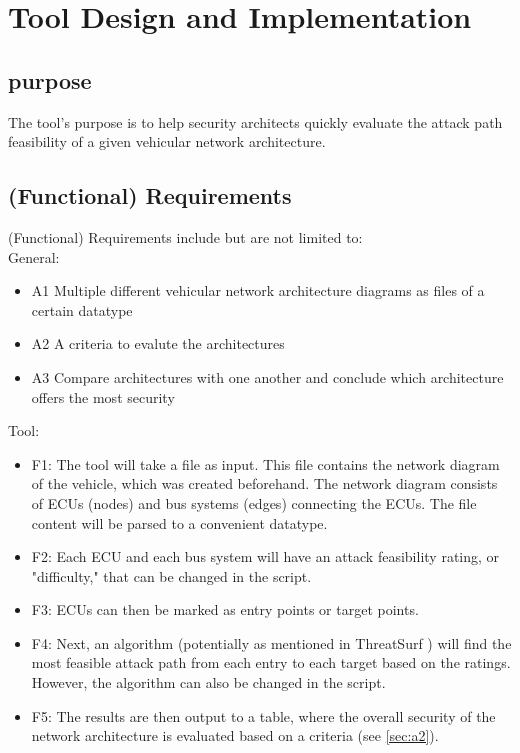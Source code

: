 \chapter{Tool Design and Implementation}
\label{chp:tool}

\section{purpose}\label{sec:purpose}

The tool's purpose is to help security architects quickly evaluate the attack path feasibility of a given vehicular network architecture. 

\section{(Functional) Requirements}\label{sec:funct-req}

(Functional) Requirements include but are not limited to:\\

General:

\begin{itemize}
	\item A1\label{sec:a1} Multiple different vehicular network architecture diagrams as files of a certain datatype 
	\item A2\label{sec:a2} A criteria to evalute the architectures
	\item A3\label{sec:a3} Compare architectures with one another and conclude which architecture offers the most security
\end{itemize}

Tool:

\begin{itemize}

\item F1\label{sec:f1}: The tool will take a file as input. This file contains the network diagram of the vehicle, which was created beforehand. The network diagram consists of ECUs (nodes) and bus systems (edges) connecting the ECUs. The file content will be parsed to a convenient datatype. 

\item F2\label{sec:f2}: Each ECU and each bus system will have an attack feasibility rating, or "difficulty," that can be changed in the script. 

\item F3\label{sec:f3}: ECUs can then be marked as entry points or target points. 

\item F4\label{sec:f4}: Next, an algorithm (potentially as mentioned in ThreatSurf \cite{threat_surf}) will find the most feasible attack path from each entry to each target based on the ratings. However, the algorithm can also be changed in the script. 

\item F5\label{sec:f5}: The results are then output to a table, where the overall security of the network architecture is evaluated based on a criteria  (see \ref{sec:a2}).

\end{itemize}

